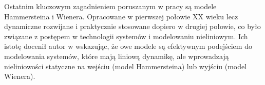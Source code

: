 Ostatnim kluczowym zagadnieniem poruszanym w pracy są modele Hammersteina i
Wienera. Opracowane w pierwszej połowie XX wieku lecz dynamiczne rozwijane i praktycznie stosowane dopiero w drugiej połowie, co było związane z postępem w technologii systemów i modelowaniu nieliniowym. Ich istotę docenił autor w \cite{20} wskazując, że owe modele są efektywnym podejściem do modelowania systemów, które mają liniową dynamikę, ale wprowadzają nieliniowości statyczne na wejściu (model Hammersteina) lub wyjściu (model Wienera).
